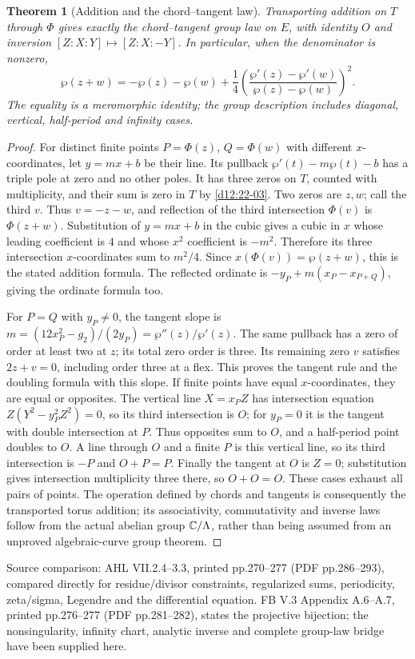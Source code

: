 \documentclass[11pt,a4paper,openany]{book}
\newtheorem{theorem}{Theorem}[chapter]
\theoremstyle{definition}
\theoremstyle{remark}\newtheorem{remark}[theorem]{Remark}
\newcommand{\family}[1]{}
\newcommand{\source}[1]{\par\begingroup\small\sffamily\color{black!65}Source comparison: #1\par\endgroup}
\begin{document}
\begin{theorem}[Addition and the chord--tangent law]\label{d12:22-09}\family{D12.22.09}
Transporting addition on $T$ through $\Phi$ gives exactly the
chord--tangent group law on $E$, with identity $O$ and inversion
$[Z:X:Y]\mapsto[Z:X:-Y]$. In particular, when the denominator is
nonzero,
\[
 \wp(z+w)=-\wp(z)-\wp(w)
       +\frac14\left(\frac{\wp'(z)-\wp'(w)}{\wp(z)-\wp(w)}\right)^2.
\]
The equality is a meromorphic identity; the group description includes
diagonal, vertical, half-period and infinity cases.
\end{theorem}
\begin{proof}
For distinct finite points $P=\Phi(z)$, $Q=\Phi(w)$ with different
$x$-coordinates, let $y=mx+b$ be their line. Its pullback
$\wp'(t)-m\wp(t)-b$ has a triple pole at zero and no other poles.
It has three zeros on $T$, counted with multiplicity, and their sum
is zero in $T$ by \cref{d12:22-03}. Two zeros are $z,w$; call the
third $v$. Thus $v=-z-w$, and reflection of the third intersection
$\Phi(v)$ is $\Phi(z+w)$. Substitution of $y=mx+b$ in the cubic
gives a cubic in $x$ whose leading coefficient is $4$ and whose
$x^2$ coefficient is $-m^2$. Therefore its three intersection
$x$-coordinates sum to $m^2/4$. Since $x(\Phi(v))=\wp(z+w)$,
this is the stated addition formula. The reflected ordinate is
$-y_P+m(x_P-x_{P+Q})$, giving the ordinate formula too.

For $P=Q$ with $y_P\ne0$, the tangent slope is
$m=(12x_P^2-g_2)/(2y_P)=\wp''(z)/\wp'(z)$.
The same pullback has a zero of order at least two at $z$; its total
zero order is three. Its remaining zero $v$ satisfies $2z+v=0$,
including order three at a flex. This proves the tangent rule and
the doubling formula with this slope.
If finite points have equal $x$-coordinates, they are equal or
opposites. The vertical line $X=x_PZ$ has intersection equation
$Z(Y^2-y_P^2Z^2)=0$, so its third intersection is $O$;
for $y_P=0$ it is the tangent with double intersection at $P$.
Thus opposites sum to $O$, and a half-period point doubles to $O$.
A line through $O$ and a finite $P$ is this vertical line, so its
third intersection is $-P$ and $O+P=P$. Finally the tangent at $O$
is $Z=0$; substitution gives intersection multiplicity three there,
so $O+O=O$. These cases exhaust all pairs of points. The operation
defined by chords and tangents is consequently the transported torus
addition; its associativity, commutativity and inverse laws follow
from the actual abelian group $\mathbb C/\Lambda$, rather than being
assumed from an unproved algebraic-curve group theorem.
\end{proof}
\source{AHL VII.2.4--3.3, printed pp.270--277 (PDF pp.286--293),
compared directly for residue/divisor constraints, regularized sums,
periodicity, zeta/sigma, Legendre and the differential equation.
FB V.3 Appendix A.6--A.7, printed pp.276--277 (PDF pp.281--282),
states the projective bijection; the nonsingularity, infinity chart,
analytic inverse and complete group-law bridge have been supplied here.}
\end{document}

